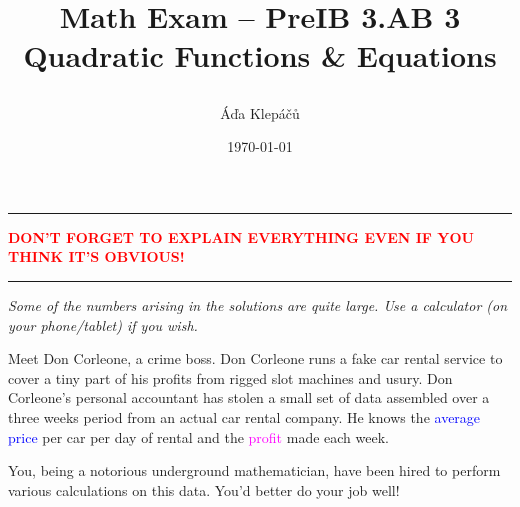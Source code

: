 \documentclass[a4paper,11pt]{article}
\title{\Huge\textsf{Math Exam -- PreIB 3.AB 3}\\
 \Large\textsf{Quadratic Functions \& Equations}
 \author{Áďa Klepáčů}
 \date{\today}
}
\newcommand{\clr}{\textcolor{red}}
\newcommand{\clb}{\textcolor{blue}}
\newcommand{\clm}{\textcolor{magenta}}
\begin{document}
\maketitle
\thispagestyle{fancy}

\begin{center}
 \hrule
 \textbf{\clr{DON'T FORGET TO EXPLAIN EVERYTHING EVEN IF YOU THINK IT'S
 OBVIOUS!}}
 \vspace{2ex}
 \hrule
 \emph{Some of the numbers arising in the solutions are quite large. Use a
 calculator (on your phone/tablet) if you wish.}
\end{center}

Meet Don Corleone, a crime boss. Don Corleone runs a fake car rental service to
cover a tiny part of his profits from rigged slot machines and usury. Don
Corleone's personal accountant has stolen a small set of data assembled over a
three weeks period from an actual car rental company. He knows the \clb{average
price} per car per day of rental and the \clm{profit} made each week.

You, being a notorious underground mathematician, have been hired to perform
various calculations on this data. You'd better do your job well!
\end{document}
